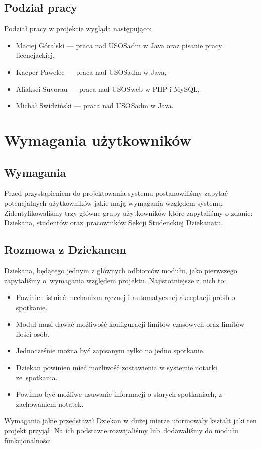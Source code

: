 \documentclass[licencjacka]{pracamgr}
\begin{document}
\section{Podział pracy}
Podział pracy w projekcie wygląda następująco:
\begin{itemize}
\setlength\itemsep{0,05em}
\item Maciej Góralski --- praca nad USOSadm w Java oraz pisanie pracy   licencjackiej,
\item Kacper Pawelec --- praca nad USOSadm w Java,
\item Aliaksei Suvorau --- praca nad USOSweb w PHP i MySQL,
\item Michał Swidziński --- praca nad USOSadm w Java.
\end{itemize}


\chapter{Wymagania użytkowników} \label{chap:wymagania}

\section{Wymagania}
Przed przystąpieniem do projektowania systemu postanowiliśmy zapytać potencjalnych użytkowników jakie mają wymagania względem systemu. Zidentyfikowaliśmy trzy główne grupy użytkowników które zapytaliśmy o zdanie: Dziekana, studentów oraz~pracowników Sekcji Studenckiej Dziekanatu.

\section{Rozmowa z Dziekanem}
Dziekana, będącego jednym z głównych odbiorców modułu, jako pierwszego zapytaliśmy o~wymagania względem projektu. Najistotniejsze z~nich to:

\begin{itemize}
\setlength\itemsep{0,05em}
\item Powinien istnieć mechanizm ręcznej i automatycznej akceptacji próśb o spotkanie.
\item Moduł musi dawać możliwość konfiguracji limitów czasowych oraz limitów ilości osób.
\item Jednocześnie można być zapisanym tylko na jedno spotkanie.
\item Dziekan powinien mieć możliwość zostawienia w systemie notatki ze~spotkania.
\item Powinno być możliwe usuwanie informacji o starych spotkaniach, z zachowaniem notatek.
\end{itemize}
Wymagania jakie przedstawił Dziekan w dużej mierze uformowały kształt jaki ten projekt przyjął. Na ich podstawie rozwijaliśmy lub~dodawaliśmy do modułu funkcjonalności.
\end{document}
